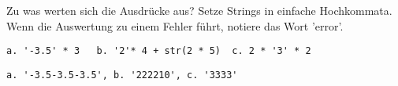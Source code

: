 \question[3]
Zu was werten sich die Ausdrücke aus? Setze Strings in einfache Hochkommata.
Wenn die Auswertung zu einem Fehler führt, notiere das
Wort 'error'.

\begin{lstlisting}
a. '-3.5' * 3   b. '2'* 4 + str(2 * 5)  c. 2 * '3' * 2
\end{lstlisting}
\begin{solutionbox}{2cm}
\begin{lstlisting}
a. '-3.5-3.5-3.5', b. '222210', c. '3333'
\end{lstlisting}
\end{solutionbox}
